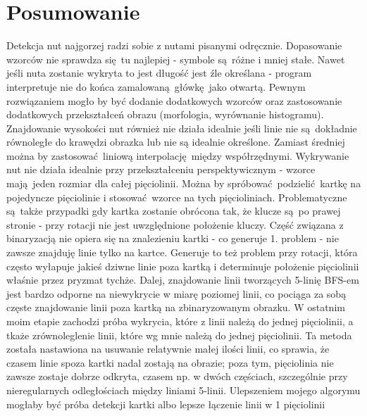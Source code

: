 \documentclass[12pt]{article}
\begin{document}
	\section{Posumowanie}
		Detekcja nut najgorzej radzi sobie z nutami pisanymi odręcznie. Dopasowanie wzorców nie sprawdza się tu najlepiej - symbole są różne i mniej stałe. Nawet jeśli nuta zostanie wykryta to jest długość jest źle określana - program interpretuje nie do końca zamalowaną główkę jako otwartą. Pewnym rozwiązaniem mogło by być dodanie dodatkowych wzorców oraz zastosowanie dodatkowych przekształceń obrazu (morfologia, wyrównanie histogramu). Znajdowanie wysokości nut również nie działa idealnie jeśli linie nie są dokładnie równoległe do krawędzi obrazka lub nie są idealnie określone. Zamiast średniej można by zastosować liniową interpolację między współrzędnymi. Wykrywanie nut nie działa idealnie przy przekształceniu perspektywicznym - wzorce mają jeden rozmiar dla całej pięciolinii. Można by spróbować podzielić kartkę na pojedyncze pięciolinie i stosować wzorce na tych pięcioliniach. Problematyczne są także przypadki gdy kartka zostanie obrócona tak, że klucze są po prawej stronie - przy rotacji nie jest uwzględnione położenie kluczy.
		\newline
		\newline
		Część związana z binaryzacją nie opiera się na znalezieniu kartki - co generuje 1. problem - nie zawsze znajduję linie tylko na kartce. Generuje to też problem przy rotacji, która często wyłapuje jakieś dziwne linie poza kartką i determinuje położenie pięciolinii właśnie przez pryzmat tychże. Dalej, znajdowanie linii tworzących 5-linię BFS-em jest bardzo odporne na niewykrycie w miarę poziomej linii, co pociąga za sobą częste znajdowanie linii poza kartką na zbinaryzowanym obrazku. W ostatnim moim etapie zachodzi próba wykrycia, które z linii należą do jednej pięciolinii, a tkaże zrównoleglenie linii, które wg mnie należą do jednej pięciolinii. Ta metoda została nastawiona na usuwanie relatywnie małej ilości linii, co sprawia, że czasem linie spoza kartki nadal zostają na obrazie; poza tym, pięciolinia nie zawsze zostaje dobrze odkryta, czasem np. w dwóch częściach, szczególnie przy nieregularnych odległościach między liniami 5-linii. Ulepszeniem mojego algorymu mogłaby być próba detekcji kartki albo lepsze łączenie linii w 1 pięciolinii
\end{document}
